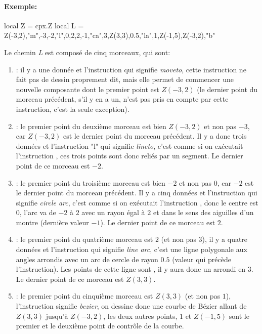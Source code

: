 \paragraph{Exemple:}
\begin{Luacode}
local Z = cpx.Z
local L = { Z(-3,2),"m",-3,-2,"l",0,2,2,-1,"ca",3,Z(3,3),0.5,"la",1,Z(-1,5),Z(-3,2),"b" } 
\end{Luacode}
Le chemin \emph{L} est composé de cinq morceaux, qui sont:
    \begin{enumerate}
        \item {}: il y a une donnée et l'instruction  qui signifie \emph{moveto}, cette instruction ne fait pas de dessin proprement dit, mais elle permet de commencer une nouvelle composante dont le premier point est $Z(-3,2)$ (le dernier point du morceau précédent, s'il y en a un, n'est pas pris en compte par cette instruction, c'est la seule exception).
        
        \item {}:  le premier point du deuxième morceau est bien $Z(-3,2)$ et non pas $-3$, car $Z(-3,2)$ est le dernier point du morceau précédent. Il y a donc trois données et l'instruction "l" qui signifie \emph{lineto}, c'est comme si on exécutait l'instruction , ces trois points sont donc reliés par un segment. Le dernier point de ce morceau est $-2$.
        
        \item {}: le premier point du troisième morceau est bien $-2$ et non pas $0$, car $-2$ est le dernier point du morceau précédent. Il y a cinq données et l'instruction  qui signifie \emph{circle arc}, c'est comme si on exécutait l'instruction , donc le centre est $0$, l'arc va de $-2$ à $2$ avec un rayon égal à $2$ et dans le sens des aiguilles d'un montre (dernière valeur $-1$). Le dernier point de ce morceau est $2$.
        \item {}: le premier point du quatrième morceau est $2$ (et non pas $3$), il y a quatre données et l'instruction  qui signifie \emph{line arc}, c'est une ligne polygonale aux angles arrondis avec un arc de cercle de rayon $0.5$ (valeur qui précède l'instruction). Les points de cette ligne sont , il y aura donc un arrondi en $3$. Le dernier point de ce morceau est $Z(3,3)$.
        
        \item {}: le premier point du cinquième morceau est $Z(3,3)$ (et non pas $1$), l'instruction  signifie \emph{bezier}, on dessine donc une courbe de Bézier allant de $Z(3,3)$ jusqu'à $Z(-3,2)$, les deux autres points, $1$ et $Z(-1,5)$ sont le premier et le deuxième point de contrôle de la courbe.
    \end{enumerate}

